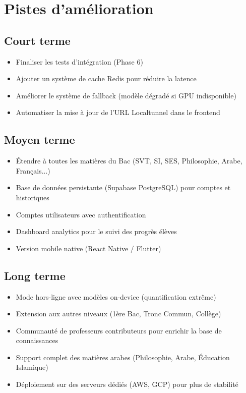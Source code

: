 \documentclass[12pt,a4paper]{report}
\begin{document}
\section{Pistes d'amélioration}

\subsection{Court terme}
\begin{itemize}
    \item Finaliser les tests d'intégration (Phase 6)
    \item Ajouter un système de cache Redis pour réduire la latence
    \item Améliorer le système de fallback (modèle dégradé si GPU indisponible)
    \item Automatiser la mise à jour de l'URL Localtunnel dans le frontend
\end{itemize}

\subsection{Moyen terme}
\begin{itemize}
    \item Étendre à toutes les matières du Bac (SVT, SI, SES, Philosophie, Arabe, Français...)
    \item Base de données persistante (Supabase PostgreSQL) pour comptes et historiques
    \item Comptes utilisateurs avec authentification
    \item Dashboard analytics pour le suivi des progrès élèves
    \item Version mobile native (React Native / Flutter)
\end{itemize}

\subsection{Long terme}
\begin{itemize}
    \item Mode hors-ligne avec modèles on-device (quantification extrême)
    \item Extension aux autres niveaux (1ère Bac, Tronc Commun, Collège)
    \item Communauté de professeurs contributeurs pour enrichir la base de connaissances
    \item Support complet des matières arabes (Philosophie, Arabe, Éducation Islamique)
    \item Déploiement sur des serveurs dédiés (AWS, GCP) pour plus de stabilité
\end{itemize}
\end{document}
